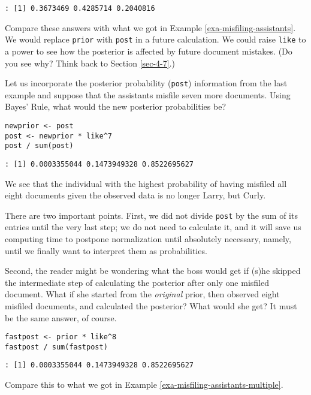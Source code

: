 \begin{verbatim}
: [1] 0.3673469 0.4285714 0.2040816
\end{verbatim}


Compare these answers with what we got in Example \ref{exa-misfiling-assistants}. We would replace \texttt{prior} with \texttt{post} in a future
calculation. We could raise \texttt{like} to a power to see how the posterior
is affected by future document mistakes. (Do you see why? Think back
to Section \ref{sec-4-7}.)



Let us incorporate the posterior probability (\texttt{post}) information from
the last example and suppose that the assistants misfile seven more
documents. Using Bayes' Rule, what would the new posterior
probabilities be?

\begin{verbatim}
newprior <- post
post <- newprior * like^7
post / sum(post)
\end{verbatim}

\begin{verbatim}
: [1] 0.0003355044 0.1473949328 0.8522695627
\end{verbatim}

We see that the individual with the highest probability of having
misfiled all eight documents given the observed data is no longer
Larry, but Curly.

There are two important points. First, we did not divide \texttt{post} by the
sum of its entries until the very last step; we do not need to
calculate it, and it will save us computing time to postpone
normalization until absolutely necessary, namely, until we finally
want to interpret them as probabilities.

Second, the reader might be wondering what the boss would get if (s)he
skipped the intermediate step of calculating the posterior after only
one misfiled document. What if she started from the \emph{original} prior,
then observed eight misfiled documents, and calculated the posterior?
What would she get? It must be the same answer, of course.

\begin{verbatim}
fastpost <- prior * like^8
fastpost / sum(fastpost)
\end{verbatim}

\begin{verbatim}
: [1] 0.0003355044 0.1473949328 0.8522695627
\end{verbatim}

Compare this to what we got in Example \ref{exa-misfiling-assistants-multiple}.

